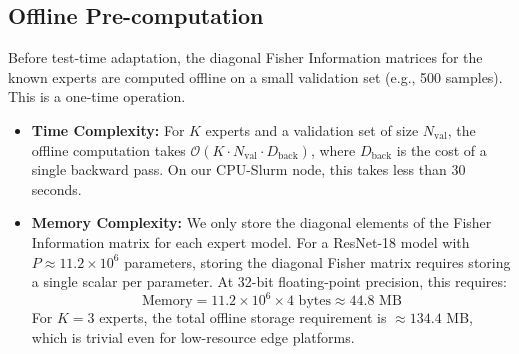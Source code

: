 \documentclass{article}
\theoremstyle{plain}
\theoremstyle{definition}
\theoremstyle{remark}
\begin{document}
\subsection{Offline Pre-computation}
Before test-time adaptation, the diagonal Fisher Information matrices for the known experts are computed offline on a small validation set (e.g., 500 samples). This is a one-time operation.
\begin{itemize}
    \item \textbf{Time Complexity:} For $K$ experts and a validation set of size $N_{\text{val}}$, the offline computation takes $\mathcal{O}(K \cdot N_{\text{val}} \cdot D_{\text{back}})$, where $D_{\text{back}}$ is the cost of a single backward pass. On our CPU-Slurm node, this takes less than 30 seconds.
    \item \textbf{Memory Complexity:} We only store the diagonal elements of the Fisher Information matrix for each expert model. For a ResNet-18 model with $P \approx 11.2 \times 10^6$ parameters, storing the diagonal Fisher matrix requires storing a single scalar per parameter. At 32-bit floating-point precision, this requires:
    \begin{equation}
        \text{Memory} = 11.2 \times 10^6 \times 4 \text{ bytes} \approx 44.8 \text{ MB}
    \end{equation}
    For $K=3$ experts, the total offline storage requirement is $\approx 134.4$ MB, which is trivial even for low-resource edge platforms.
\end{itemize}
\end{document}

